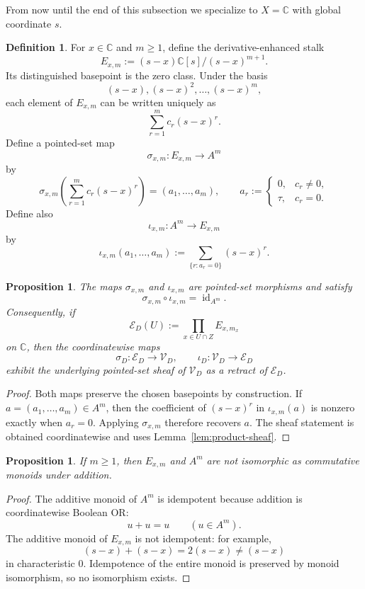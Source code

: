 \documentclass[11pt,a4paper]{article}
\numberwithin{equation}{section}
\newtheorem{proposition}[theorem]{Proposition}
\theoremstyle{definition}
\newtheorem{definition}[theorem]{Definition}
\theoremstyle{remark}
\newcommand{\CC}{\mathbb C}
\newcommand{\cV}{\mathcal V}
\newcommand{\cE}{\mathcal E}
\newcommand{\taup}{\tau}
\begin{document}
From now until the end of this subsection we specialize to $X=\CC$ with global coordinate $s$.

\begin{definition}
For $x\in\CC$ and $m\ge1$, define the derivative-enhanced stalk
\[
E_{x,m}:=(s-x)\CC[s]/(s-x)^{m+1}.
\]
Its distinguished basepoint is the zero class.  Under the basis
\[
(s-x),(s-x)^2,\dots,(s-x)^m,
\]
each element of $E_{x,m}$ can be written uniquely as
\[
\sum_{r=1}^m c_r(s-x)^r.
\]
Define a pointed-set map
\[
\sigma_{x,m}:E_{x,m}\to A^m
\]
by
\[
\sigma_{x,m}\!\left(\sum_{r=1}^m c_r(s-x)^r\right)=(a_1,\dots,a_m),
\qquad
 a_r:=\begin{cases}0,& c_r\neq0,\\ \taup,& c_r=0.\end{cases}
\]
Define also
\[
\iota_{x,m}:A^m\to E_{x,m}
\]
by
\[
\iota_{x,m}(a_1,\dots,a_m):=\sum_{\{r:a_r=0\}}(s-x)^r.
\]
\end{definition}

\begin{proposition}\label{prop:pointed-retract}
The maps $\sigma_{x,m}$ and $\iota_{x,m}$ are pointed-set morphisms and satisfy
\[
\sigma_{x,m}\circ\iota_{x,m}=\operatorname{id}_{A^m}.
\]
Consequently, if
\[
\cE_D(U):=\prod_{x\in U\cap Z}E_{x,m_x}
\]
on $\CC$, then the coordinatewise maps
\[
\sigma_D:\cE_D\to\cV_D,
\qquad
\iota_D:\cV_D\to\cE_D
\]
exhibit the underlying pointed-set sheaf of $\cV_D$ as a retract of $\cE_D$.
\end{proposition}

\begin{proof}
Both maps preserve the chosen basepoints by construction.  If $a=(a_1,\dots,a_m)\in A^m$, then the coefficient of $(s-x)^r$ in $\iota_{x,m}(a)$ is nonzero exactly when $a_r=0$.  Applying $\sigma_{x,m}$ therefore recovers $a$.  The sheaf statement is obtained coordinatewise and uses Lemma~\ref{lem:product-sheaf}.
\end{proof}

\begin{proposition}\label{prop:not-cmon-iso}
If $m\ge1$, then $E_{x,m}$ and $A^m$ are not isomorphic as commutative monoids under addition.
\end{proposition}

\begin{proof}
The additive monoid of $A^m$ is idempotent because addition is coordinatewise Boolean OR:
\[
u+u=u\qquad (u\in A^m).
\]
The additive monoid of $E_{x,m}$ is not idempotent: for example,
\[
(s-x)+(s-x)=2(s-x)\neq (s-x)
\]
in characteristic $0$.  Idempotence of the entire monoid is preserved by monoid isomorphism, so no isomorphism exists.
\end{proof}
\end{document}
